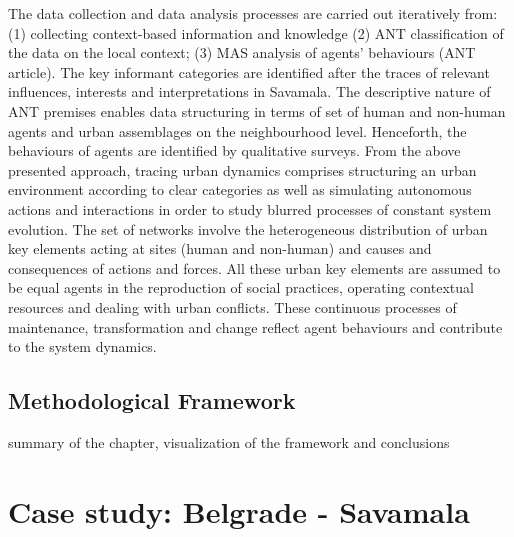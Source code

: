 \documentclass[11pt]{report}
\begin{document}
The data collection and data analysis processes are carried out iteratively from: (1) collecting context-based information and knowledge (2) ANT classification of the data on the local context; (3) MAS analysis of agents’ behaviours (ANT article). The key informant categories are identified after the traces of relevant influences, interests and interpretations in Savamala. The descriptive nature of ANT premises enables data structuring in terms of set of human and non-human agents and urban assemblages on the neighbourhood level. Henceforth, the behaviours of agents are identified by qualitative surveys.
From the above presented approach, tracing urban dynamics comprises structuring an urban environment according to clear categories as well as simulating autonomous actions and interactions in order to study blurred processes of constant system evolution. The set of networks involve the heterogeneous distribution of urban key elements acting at sites (human and non-human) and causes and consequences of actions and forces. All these urban key elements are assumed to be equal agents in the reproduction of social practices, operating contextual resources and dealing with urban conflicts. These continuous processes of maintenance, transformation and change reflect agent behaviours and contribute to the system dynamics.

\section{Methodological Framework}
summary of the chapter, visualization of the framework and conclusions


\chapter{Case study: Belgrade - Savamala}
\end{document}
